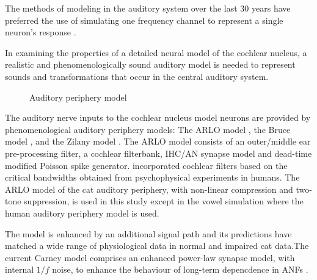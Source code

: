 \medskip{}

 The methods of
modeling in the auditory system over the last 30 years have preferred
the use of simulating one frequency channel to represent a single
neuron's response \citep{DavisVoigt:1991,Carney:1993}.


%
\medskip{}

In examining the properties of a detailed neural model of the cochlear
nucleus, a realistic and phenomenologically sound auditory model is
needed to represent sounds and transformations that occur in the
central auditory system.

\begin{figure}[tbh]
  \begin{center}
    \caption{Auditory periphery model \citep{ZilanyBruceEtAl:2009}}
    \label{fig:ZilanyBruceFig}
  \end{center}
\end{figure}


The auditory nerve inputs to the cochlear nucleus model neurons are
provided by phenomenological auditory periphery models: The ARLO model
\citep{HeinzZhangEtAl:2001}, the Bruce model
\citep{BruceSachsEtAl:2003,ZilanyBruce:2006,ZilanyBruce:2007}, and the
Zilany model \citep{ZilanyBruceEtAl:2009}. The ARLO model consists of
an outer/middle ear pre-processing filter, a cochlear filterbank,
IHC/AN synapse model and dead-time modified Poisson spike
generator. \citep{HeinzZhangEtAl:2001} incorporated cochlear filters
based on the critical bandwidths obtained from psycho\-physical
experiments in humans. The ARLO model of the cat auditory periphery,
with non-linear compression and two-tone suppression, is used in this
study except in the vowel simulation where the human auditory
periphery model is used.

\medskip{}

The \citet{ZilanyBruce:2007} model is enhanced by an additional signal
path and its predictions have matched a wide range of physiological
data in normal and impaired cat data.The current Carney model
comprises an enhanced power-law synapse model, with internal $1/f$
noise, to enhance the behaviour of long-term depencdence in ANFs
\citep{ZilanyBruceEtAl:2009}.

